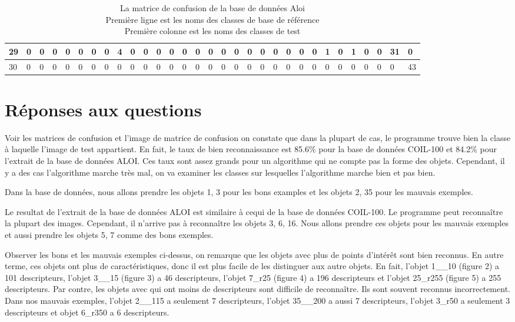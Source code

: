 \documentclass[french,12pt,a4paper,oneside,notitlepage]{report}
\begin{document}
\begin{table}[!ht]
\begin{center}
{\begin{tabular}{|l|l|l|l|l|l|l|l|l|l|l|l|l|l|l|l|l|l|l|l|l|l|l|l|l|l|l|l|l|l|l|}
\hline
29 & 0 & 0 & 0 & 0 & 0 & 0 & 0 & 4 & 0 & 0 & 0 & 0 & 0 & 0 & 0 & 0 & 0 & 0 & 0 & 0 & 0 & 0 & 0 & 1 & 0 & 1 & 0 & 0 & 31 & 0 \\
\hline
30 & 0 & 0 & 0 & 0 & 0 & 0 & 0 & 0 & 0 & 0 & 0 & 0 & 0 & 0 & 0 & 0 & 0 & 0 & 0 & 0 & 0 & 0 & 0 & 0 & 0 & 0 & 0 & 0 & 0 & 43 \\
\hline
	    \end{tabular}
	}
	\end{center}
	\caption {La matrice de confusion de la base de données Aloi\\
	\hspace*{1.7cm}  Première ligne est les noms des classes de base de référence\\
	\hspace*{1.7cm}  Première colonne est les noms des classes de test}
\end{table}

\section{Réponses aux questions}
Voir les matrices de confusion et l'image de matrice de confusion on constate que dans la plupart de cas, le programme 
trouve bien la classe à laquelle l'image de test appartient. En fait, le taux de bien reconnaissance est 85.6\% pour la base de 
données COIL-100 et 84.2\% pour l'extrait de la base de données ALOI. Ces taux sont assez grands pour un algorithme qui ne compte pas
la forme des objets. Cependant, il y a des cas l'algorithme marche très mal, on va examiner les classes sur lesquelles l'algorithme marche
bien et pas bien. 

Dans la base de données, nous allons prendre les objets 1, 3 pour les bons examples et les objets 2, 35 pour les mauvais exemples.

Le resultat de l'extrait de la base de données ALOI est similaire à cequi de la base de données COIL-100. Le programme peut reconnaître la
plupart des images. Cependant, il n'arrive pas à reconnaître les objets 3, 6, 16. Nous allons prendre ces objets pour les mauvais exemples
et aussi prendre les objets 5, 7 comme des bons exemples.

Observer les bons et les mauvais exemples ci-dessus, on remarque que les objets avec plus de points d'intérêt sont bien reconnus. En autre terme,
ces objets ont plus de caractéristiques, donc il est plus facile de les distinguer aux autre objets. En fait, l'objet 1\_\_10 (figure 2)
a 101 descripteurs, l'objet 3\_\_15 (figure 3) a 46 descripteurs, l'objet 7\_r25 (figure 4) a 196 descripteurs et l'objet 25\_r255 (figure 5)
a 255 descripteurs.
Par contre, les objets avec qui ont moins de descripteurs sont difficile de reconnaître. Ils sont souvent reconnus incorrectement. Dans nos 
mauvais exemples, l'objet 2\_\_115 a seulement 7 descripteurs, l'objet 35\_\_200 a aussi 7 descripteurs, l'objet  3\_r50 a seulement 3 descripteurs et 
objet 6\_r350 a 6 descripteurs.
\end{document}

